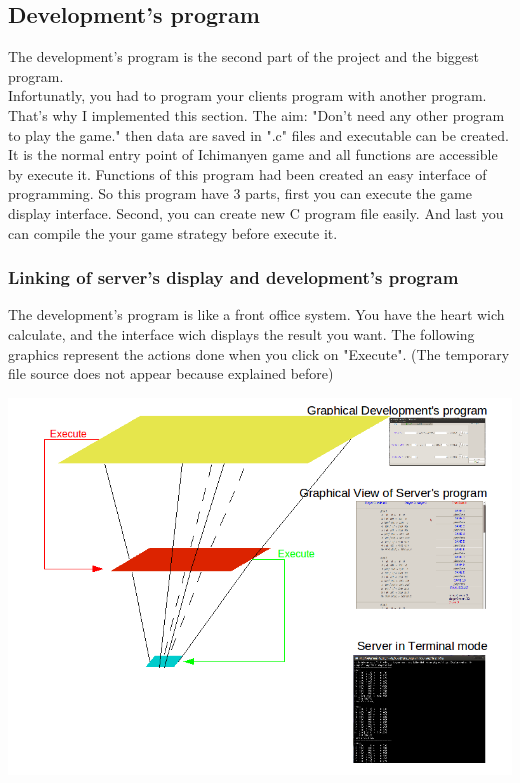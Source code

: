 \documentclass[11pt]{sample}
\begin{document}
\subsection{Development's program}
The development's program is the second part of the project and the biggest program.\\ 
Infortunatly, you had to program your clients program with another program. That's why I implemented this section. The aim: "Don't need any other program to play the game." then data are saved in ".c" files and executable can be created.\\
It is the normal entry point of Ichimanyen game and all functions are accessible by execute it. Functions of this program had been created an easy interface of programming. So this program have 3 parts, first you can execute the game display interface. Second, you can create new C program file easily. And last you can compile the your game strategy before execute it.
\subsubsection{Linking of server's display and development's program}
The development's program is like a front office system. You have the heart wich calculate, and the interface wich displays the result you want. The following graphics represent the actions done when you click on "Execute". (The temporary file source does not appear because explained before)
\begin{center}\includegraphics[height=22\baselineskip]{img/Graph_IDE_Representation.png}\end{center}
\end{document}
